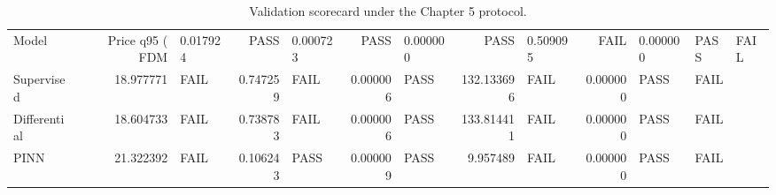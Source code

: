 \begin{table}
\caption{Validation scorecard under the Chapter 5 protocol.}
\label{tab:validation_scorecard}
\begin{tabular}{lrlrlrlrlrll}
\toprule
Model & Price q95 (%
\midrule
FDM & 0.017924 & PASS & 0.000723 & PASS & 0.000000 & PASS & 0.509095 & FAIL & 0.000000 & PASS & FAIL \\
Supervised & 18.977771 & FAIL & 0.747259 & FAIL & 0.000006 & PASS & 132.133696 & FAIL & 0.000000 & PASS & FAIL \\
Differential & 18.604733 & FAIL & 0.738783 & FAIL & 0.000006 & PASS & 133.814411 & FAIL & 0.000000 & PASS & FAIL \\
PINN & 21.322392 & FAIL & 0.106243 & PASS & 0.000009 & PASS & 9.957489 & FAIL & 0.000000 & PASS & FAIL \\
\bottomrule
\end{tabular}
\end{table}
